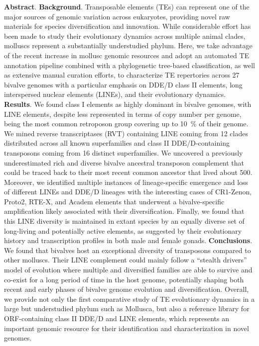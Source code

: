 \vspace{4mm}

\textbf{Abstract}. \textbf{Background}. Transposable elements (TEs) can represent one of the major sources of genomic variation across eukaryotes, providing novel raw materials for species diversification and innovation. While considerable effort has been made to study their evolutionary dynamics across multiple animal clades, molluscs represent a substantially understudied phylum. Here, we take advantage of the recent increase in mollusc genomic resources and adopt an automated TE annotation pipeline combined with a phylogenetic tree-based classification, as well as extensive manual curation efforts, to characterize TE repertories across 27 bivalve genomes with a particular emphasis on DDE/D class II elements, long interspersed nuclear elements (LINEs), and their evolutionary dynamics. \textbf{Results}. We found class I elements as highly dominant in bivalve genomes, with LINE elements, despite less represented in terms of copy number per genome, being the most common retroposon group covering up to \qty{10}{\percent} of their genome. We mined  reverse transcriptases (RVT) containing LINE coming from 12 clades distributed across all known superfamilies and  class II DDE/D-containing transposons coming from 16 distinct superfamilies. We uncovered a previously underestimated rich and diverse bivalve ancestral transposon complement that could be traced back to their most recent common ancestor that lived about \qty{500}{\mya}. Moreover, we identified multiple instances of lineage-specific emergence and loss of different LINEs and DDE/D lineages with the interesting cases of CR1-Zenon, Proto2, RTE-X, and Academ elements that underwent a bivalve-specific amplification likely associated with their diversification. Finally, we found that this LINE diversity is maintained in extant species by an equally diverse set of long-living and potentially active elements, as suggested by their evolutionary history and transcription profiles in both male and female gonads. \textbf{Conclusions}. We found that bivalves host an exceptional diversity of transposons compared to other molluscs. Their LINE complement could mainly follow a “stealth drivers” model of evolution where multiple and diversified families are able to survive and co-exist for a long period of time in the host genome, potentially shaping both recent and early phases of bivalve genome evolution and diversification. Overall, we provide not only the first comparative study of TE evolutionary dynamics in a large but understudied phylum such as Mollusca, but also a reference library for ORF-containing class II DDE/D and LINE elements, which represents an important genomic resource for their identification and characterization in novel genomes.

